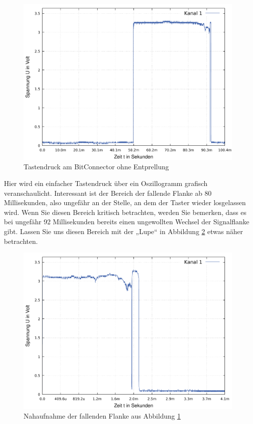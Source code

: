 \documentclass{article}
\begin{document}
\begin{figure}[!h]
	\centering
	\includegraphics[width=0.92\linewidth]{Figures/bounce}
	\caption{Tastendruck am BitConnector ohne Entprellung}
	\label{fig:prellen_1}
\end{figure}

Hier wird ein einfacher Tastendruck über ein Oszillogramm grafisch veranschaulicht. Interessant ist der Bereich der fallende Flanke ab 80 Millisekunden, also ungefähr an der Stelle, an dem der Taster wieder losgelassen wird. Wenn Sie diesen Bereich kritisch betrachten, werden Sie bemerken, dass es bei ungefähr 92 Millisekunden bereits einen ungewollten Wechsel der Signalflanke gibt. Lassen Sie uns diesen Bereich mit der „Lupe“ in Abbildung \ref{fig:prellen_2} etwas näher betrachten.

\begin{figure}[!h]
	\centering
	\includegraphics[width=0.92\linewidth]{Figures/bounce_near}
	\caption{Nahaufnahme der fallenden Flanke aus Abbildung \ref{fig:prellen_1}}
	\label{fig:prellen_2}
\end{figure}
\end{document}
